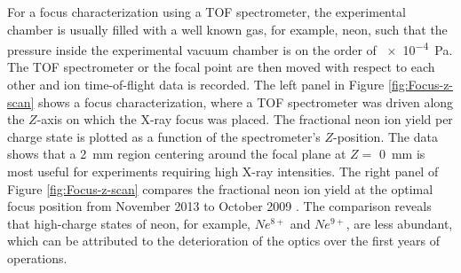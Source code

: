 %
For a focus characterization using a TOF spectrometer, the experimental chamber is usually filled with a well known gas, for example, neon, such that the pressure inside the experimental vacuum chamber is on the order of \SI{e-4}{\pascal}. The TOF spectrometer or the focal point are then moved with respect to each other and ion time-of-flight data is recorded. The left panel in Figure \ref{fig:Focus-z-scan} shows a focus characterization, where a TOF spectrometer was driven along the $Z$-axis on which the X-ray focus was placed. The fractional neon ion yield per charge state is plotted as a function of the spectrometer's $Z$-position. The data shows that a \SI{2}{\milli\meter} region centering around the focal plane at $Z=$ \SI{0}{\milli\meter} is most useful for experiments requiring high X-ray intensities. The right panel of Figure \ref{fig:Focus-z-scan} compares the fractional neon ion yield at the optimal focus position from November \num{2013} \citep{Bucher-2016-Unpublished} to October \num{2009} \citep{Doumy-2011-PRL}. The comparison reveals that high-charge states of neon, for example, $Ne^{8+}$ and $Ne^{9+}$, are less abundant, which can be attributed to the deterioration of the optics over the first years of operations.
%
%
%
